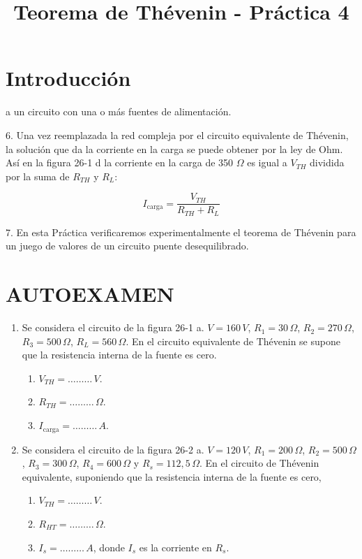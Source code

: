 \documentclass{article}
\title{Teorema de Thévenin - Práctica 4}
\author{}
\date{}
\begin{document}
\maketitle

\section*{Introducción}
a un circuito con una o más fuentes de alimentación.

6. Una vez reemplazada la red compleja por el circuito equivalente de Thévenin, la solución que da la corriente en la carga se puede obtener por la ley de Ohm. Así en la figura 26-1 d la corriente en la carga de 350 $\Omega$ es igual a $V_{TH}$ dividida por la suma de $R_{TH}$ y $R_L$:

\[
I_{\text{carga}} = \frac{V_{TH}}{R_{TH} + R_L}
\]

7. En esta Práctica verificaremos experimentalmente el teorema de Thévenin para un juego de valores de un circuito puente desequilibrado.

\section{AUTOEXAMEN}

\begin{enumerate}
    \item Se considera el circuito de la figura 26-1 a. $V = 160 \, V$, $R_1 = 30 \, \Omega$, $R_2 = 270 \, \Omega$, $R_3 = 500 \, \Omega$, $R_L = 560 \, \Omega$. En el circuito equivalente de Thévenin se supone que la resistencia interna de la fuente es cero.
    \begin{enumerate}
        \item $V_{TH} = \ldots \ldots \ldots \, V$.
        \item $R_{TH} = \ldots \ldots \ldots \, \Omega$.
        \item $I_{\text{carga}} = \ldots \ldots \ldots \, A$.
    \end{enumerate}
    
    \item Se considera el circuito de la figura 26-2 a. $V = 120 \, V$, $R_1 = 200 \, \Omega$, $R_2 = 500 \, \Omega$, $R_3 = 300 \, \Omega$, $R_4 = 600 \, \Omega$ y $R_s = 112,5 \, \Omega$. En el circuito de Thévenin equivalente, suponiendo que la resistencia interna de la fuente es cero,
    \begin{enumerate}
        \item $V_{TH} = \ldots \ldots \ldots \, V$.
        \item $R_{HT} = \ldots \ldots \ldots \, \Omega$.
        \item $I_s = \ldots \ldots \ldots \, A$, donde $I_s$ es la corriente en $R_s$.
    \end{enumerate}
\end{enumerate}
\end{document}
